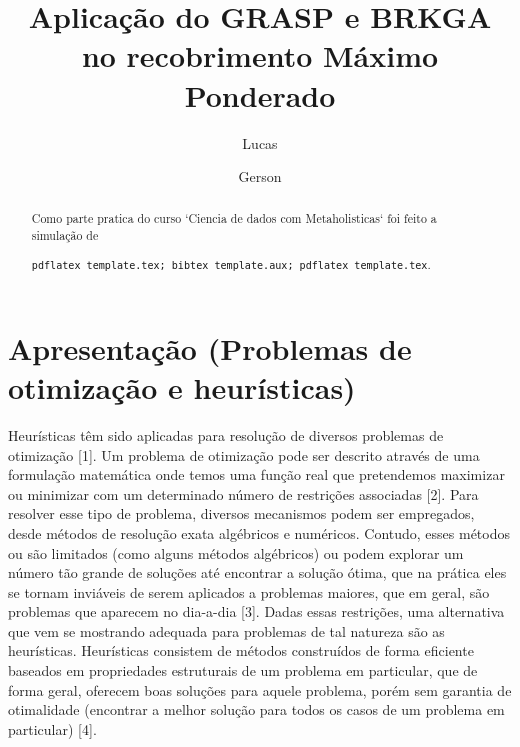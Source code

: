 \documentclass{amsart}
\begin{document}
\title[Aplicação do GRASP e BRKGA]{Aplicação do GRASP e BRKGA no recobrimento Máximo Ponderado}


\author[V. Lucas]{Lucas}
\address[V. Lucas]{ITA, São José dos Campos, SP}

\author[P. Gerson]{Gerson}
\address[P. Gerson]{ITA, São José dos Campos, SP}


\begin{abstract}

Como parte pratica do curso `Ciencia de dados com Metaholisticas` foi feito a simulação de

\texttt{pdflatex template.tex; bibtex template.aux; pdflatex template.tex}.
\end{abstract}
%
\maketitle


\section{Apresentação (Problemas de otimização e heurísticas)}
\label{s_sec1}

Heurísticas têm sido aplicadas para resolução de diversos problemas de otimização [1]. Um problema de otimização pode ser descrito através de uma formulação matemática onde temos uma função real que pretendemos maximizar ou minimizar com um determinado número de restrições associadas [2]. Para resolver esse tipo de problema, diversos mecanismos podem ser empregados, desde métodos de resolução exata algébricos e numéricos. Contudo, esses métodos ou são limitados (como alguns métodos algébricos) ou podem explorar um número tão grande de soluções até encontrar a solução ótima, que na prática eles se tornam inviáveis de serem aplicados a problemas maiores, que em geral, são problemas que aparecem no dia-a-dia [3]. Dadas essas restrições, uma alternativa que vem se mostrando adequada para problemas de tal natureza são as heurísticas. Heurísticas consistem de métodos construídos de forma eficiente baseados em propriedades estruturais de um problema em particular, que de forma geral, oferecem boas soluções para aquele problema, porém sem garantia de otimalidade (encontrar a melhor solução para todos os casos de um problema em particular) [4].
\end{document}
